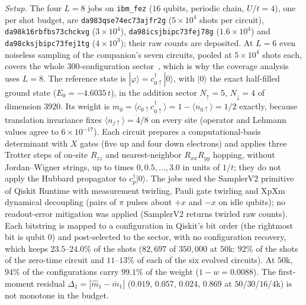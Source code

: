 \documentclass[aps,prb,onecolumn,superscriptaddress,longbibliography,floatfix]{revtex4-2}
\begin{document}
\emph{Setup.} The four $L=8$ jobs on \texttt{ibm\_fez} ($16$ qubits, periodic chain, $U/t=4$), one per shot budget, are \texttt{da983qse74ec73ajfr2g} ($5\times10^4$ shots per circuit), \texttt{da98k16rbfbs73chckvg} ($3\times10^4$), \texttt{da98icsjbipc73fej78g} ($1.6\times10^4$) and \texttt{da98cksjbipc73fej1tg} ($4\times10^3$); their raw counts are deposited. At $L=6$ even noiseless sampling of the companion's seven circuits, pooled at $5\times10^{4}$ shots each, covers the whole $300$-configuration sector~\cite{SQDspec2608}, which is why the coverage analysis uses $L=8$. The reference state is $|\varphi\rangle=c^{\dagger}_{0\uparrow}|0\rangle$, with $|0\rangle$ the exact half-filled ground state ($E_0=-4.6035\,t$), in the addition sector $N_\uparrow=5$, $N_\downarrow=4$ of dimension $3920$. Its weight is $m_0=\langle c_{0\uparrow}c^{\dagger}_{0\uparrow}\rangle=1-\langle n_{0\uparrow}\rangle=1/2$ exactly, because translation invariance fixes $\langle n_{j\uparrow}\rangle=4/8$ on every site (operator and Lehmann values agree to $6\times10^{-17}$). Each circuit prepares a computational-basis determinant with $X$ gates (five up and four down electrons) and applies three Trotter steps of on-site $R_{zz}$ and nearest-neighbor $R_{xx}R_{yy}$ hopping, without Jordan--Wigner strings, up to times $0,0.5,\dots,3.0$ in units of $1/t$; they do not apply the Hubbard propagator to $c^{\dagger}_p|0\rangle$. The jobs used the SamplerV2 primitive of Qiskit Runtime with measurement twirling, Pauli gate twirling and XpXm dynamical decoupling (pairs of $\pi$ pulses about $+x$ and $-x$ on idle qubits); no readout-error mitigation was applied (SamplerV2 returns twirled raw counts). Each bitstring is mapped to a configuration in Qiskit's bit order (the rightmost bit is qubit $0$) and post-selected to the sector, with no configuration recovery, which keeps $23.5$--$24.0\%$ of the shots ($82{,}697$ of $350{,}000$ at $50$k: $92\%$ of the shots of the zero-time circuit and $11$--$13\%$ of each of the six evolved circuits). At $50$k, $94\%$ of the configurations carry $99.1\%$ of the weight ($1-w=0.0088$). The first-moment residual $\Delta_1=|\widehat m_1-\bar m_1|$ ($0.019$, $0.057$, $0.024$, $0.869$ at $50$/$30$/$16$/$4$k) is not monotone in the budget.
\end{document}
